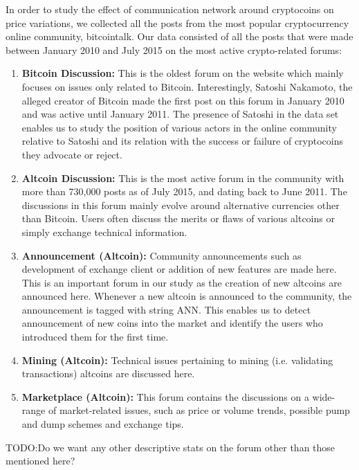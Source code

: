 In order to study the effect of communication network around cryptocoins on
price variations, we collected all the posts from the most popular cryptocurrency
online community, bitcointalk.  Our data consisted of all the posts that were
made between January 2010 and July 2015 on the most active crypto-related forums:
\begin{enumerate}[topsep=0pt,itemsep=-0.5ex,partopsep=1ex,parsep=1ex]
  \item \textbf{Bitcoin Discussion:} This is the oldest forum on the website which mainly focuses
    on issues only related to Bitcoin. Interestingly, Satoshi Nakamoto, the alleged
    creator of Bitcoin made the first post on this forum in January 2010 and
    was active until January 2011. The presence of Satoshi in the data set enables us
    to study the position of various actors in the online community relative to Satoshi
    and its relation with the success or failure of cryptocoins they advocate or reject.
  \item \textbf{Altcoin Discussion:} This is the most active forum in the community
    with more than 730,000 posts as of July 2015, and dating back to June 2011.
    The discussions in this forum mainly evolve around alternative currencies
    other than Bitcoin. Users often discuss the merits or flaws of various
    altcoins or simply exchange technical information.
  \item \textbf{Announcement (Altcoin):} Community announcements such as development of 
    exchange client or addition of new features are made here. This is an important forum
    in our study as the creation of new altcoins are announced here. Whenever a new
    altcoin is announced to the community, the announcement is tagged with string ANN.
    This enables us to detect announcement of new coins into the market and identify
    the users who introduced them for the first time.
  \item \textbf{Mining (Altcoin):} Technical issues pertaining to mining (i.e. validating transactions)
    altcoins are discussed here.
  \item \textbf{Marketplace (Altcoin):} This forum contains the discussions on a wide-range of 
    market-related issues, such as price or volume trends, possible pump and dump schemes
    and exchange tips.
\end{enumerate}

TODO:Do we want any other descriptive stats on the forum other than those mentioned here? 

